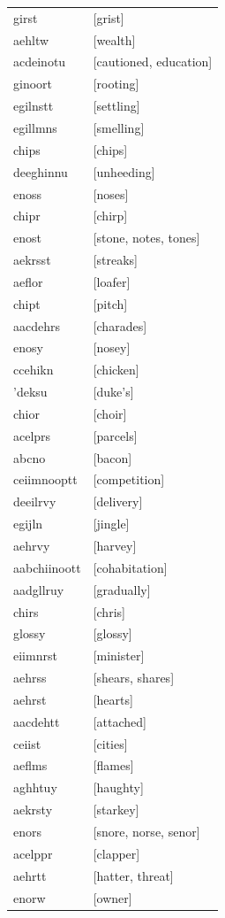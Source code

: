 \documentclass{article}
\begin{document}
\begin{tabular}{ll}
girst & [grist] \\
aehltw & [wealth] \\
acdeinotu & [cautioned, education] \\
ginoort & [rooting] \\
egilnstt & [settling] \\
egillmns & [smelling] \\
chips & [chips] \\
deeghinnu & [unheeding] \\
enoss & [noses] \\
chipr & [chirp] \\
enost & [stone, notes, tones] \\
aekrsst & [streaks] \\
aeflor & [loafer] \\
chipt & [pitch] \\
aacdehrs & [charades] \\
enosy & [nosey] \\
ccehikn & [chicken] \\
'deksu & [duke's] \\
chior & [choir] \\
acelprs & [parcels] \\
abcno & [bacon] \\
ceiimnooptt & [competition] \\
deeilrvy & [delivery] \\
egijln & [jingle] \\
aehrvy & [harvey] \\
aabchiinoott & [cohabitation] \\
aadgllruy & [gradually] \\
chirs & [chris] \\
glossy & [glossy] \\
eiimnrst & [minister] \\
aehrss & [shears, shares] \\
aehrst & [hearts] \\
aacdehtt & [attached] \\
ceiist & [cities] \\
aeflms & [flames] \\
aghhtuy & [haughty] \\
aekrsty & [starkey] \\
enors & [snore, norse, senor] \\
acelppr & [clapper] \\
aehrtt & [hatter, threat] \\
enorw & [owner] \\

\end{tabular}
\end{document}
